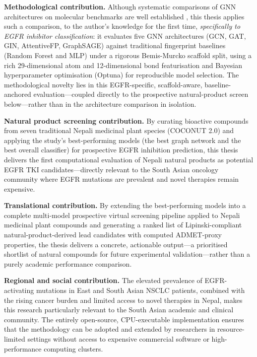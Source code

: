 \textbf{Methodological contribution.} Although systematic comparisons of GNN
architectures on molecular benchmarks are well established
\parencite{jiang2021gnn}, this thesis applies such a comparison, to the author's knowledge for
the first time, \emph{specifically to EGFR inhibitor classification}: it evaluates
five GNN architectures (GCN, GAT, GIN, AttentiveFP, GraphSAGE) against traditional
fingerprint baselines (Random Forest and MLP) under a rigorous Bemis-Murcko scaffold
split, using a rich 29-dimensional atom and 12-dimensional bond featurisation and
Bayesian hyperparameter optimisation (Optuna) for reproducible model selection. The
methodological novelty lies in this EGFR-specific, scaffold-aware, baseline-anchored
evaluation---coupled directly to the prospective natural-product screen below---rather
than in the architecture comparison in isolation.

\textbf{Natural product screening contribution.} By curating bioactive compounds
from seven traditional Nepali medicinal plant species (COCONUT 2.0) and applying the
study's best-performing models (the best graph network and the best overall
classifier) for prospective EGFR inhibition prediction, this thesis delivers the
first computational evaluation of Nepali natural products as potential EGFR TKI
candidates---directly relevant to the South Asian oncology community where EGFR
mutations are prevalent and novel therapies remain expensive.

\textbf{Translational contribution.} By extending the best-performing models into a
complete multi-model prospective virtual screening pipeline applied to
Nepali medicinal plant compounds and generating a ranked list of
Lipinski-compliant natural-product-derived
lead candidates with computed ADMET-proxy properties, the thesis delivers a concrete,
actionable output---a prioritised shortlist of natural compounds for future
experimental validation---rather than a purely academic performance comparison.

\textbf{Regional and social contribution.} The elevated prevalence of EGFR-activating
mutations in East and South Asian NSCLC patients, combined with the rising cancer
burden and limited access to novel therapies in Nepal, makes this research
particularly relevant to the South Asian academic and clinical community. The
entirely open-source, CPU-executable implementation ensures that the methodology
can be adopted and extended by researchers in resource-limited settings without
access to expensive commercial software or high-performance computing clusters.

